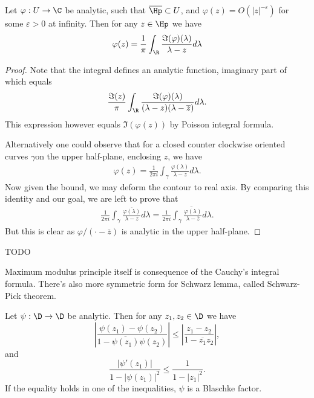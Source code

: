 \begin{lause}
	Let $\varphi : U \to \C$ be analytic, such that $\overline{\Hp} \subset U$, and $\varphi(z) = O(|z|^{-\varepsilon})$ for some $\varepsilon > 0$ at infinity. Then for any $z \in \Hp$ we have
	\begin{align*}
		\varphi(z) = \frac{1}{\pi}\int_{\R} \frac{\Im(\varphi)(\lambda)}{\lambda - z} d \lambda
	\end{align*}
\end{lause}
\begin{proof}
	Note that the integral defines an analytic function, imaginary part of which equals
	\begin{align*}
		\frac{\Im(z)}{\pi}\int_{\R} \frac{\Im(\varphi)(\lambda)}{(\lambda - z)(\lambda - \overline{z})} d \lambda.
	\end{align*}
	This expression however equals $\Im(\varphi(z))$ by Poisson integral formula.

	Alternatively one could observe that for a closed counter clockwise oriented curves $\gamma $on the upper half-plane, enclosing $z$, we have
	\begin{align*}
		\varphi(z) = \frac{1}{2\pi i}\int_{\gamma} \frac{\varphi(\lambda)}{\lambda - z} d \lambda.
	\end{align*}
	Now given the bound, we may deform the contour to real axis. By comparing this identity and our goal, we are left to prove that
	\begin{align*}
		\frac{1}{2\pi i}\int_{\gamma} \frac{\overline{\varphi(\lambda)}}{\lambda - z} d \lambda = \frac{1}{2\pi i} \overline{\int_{\gamma} \frac{\varphi(\lambda)}{\lambda - \overline{z}} d \lambda}.
	\end{align*}
	But this is clear as $\varphi/(\cdot - \overline{z})$ is analytic in the upper half-plane.
\end{proof}

TODO

Maximum modulus principle itself is consequence of the Cauchy's integral formula. There's also more symmetric form for Schwarz lemma, called Schwarz-Pick theorem.

\begin{lause}
	Let $\psi : \D \to \D$ be analytic. Then for any $z_{1}, z_{2} \in \D$ we have
	\[
		\left|\frac{\psi(z_{1}) - \psi(z_{2})}{1 - \overline{\psi(z_{1})} \psi(z_{2})} \right| \leq \left|\frac{z_{1} - z_{2}}{1 - \overline{z_{1}}z_{2}}\right|,
	\]
	and
	\[
		\frac{\left|\psi'(z_{1})\right|}{1 - |\psi(z_{1})|^2} \leq \frac{1}{1 - |z_{1}|^2}.
	\]
	If the equality holds in one of the inequalities, $\psi$ is a Blaschke factor.
\end{lause}

